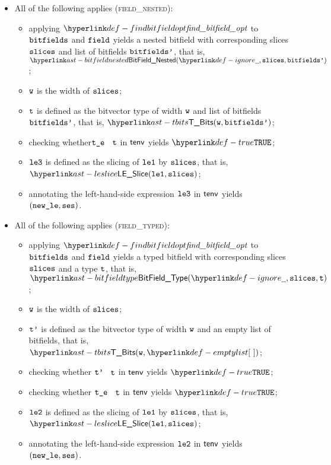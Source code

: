 \begin{itemize}
\begin{itemize}
    \item All of the following applies (\textsc{field\_nested}):
    \begin{itemize}
      \item applying $\findbitfieldopt$ to $\texttt{bitfields}$ and $\texttt{field}$ yields a nested bitfield with corresponding
            slices $\texttt{slices}$ and list of bitfields $\texttt{bitfields'}$, that is, \\ $\BitFieldNested(\Ignore, \slices, \bitfieldsp)$;
      \item $\texttt{w}$ is the width of $\texttt{slices}$;
      \item $\texttt{t}$ is defined as the bitvector type of width $\texttt{w}$ and list of bitfields $\texttt{bitfields'}$, that is, $\TBits(\vw, \bitfieldsp)$;
      \item checking whether$\texttt{t\_e}$ \typesatisfies\ $\texttt{t}$ in $\textsf{tenv}$ yields $\True$\ProseOrTypeError;
      \item $\texttt{le3}$ is defined as the slicing of $\texttt{le1}$ by $\texttt{slices}$, that is, \\ $\LESlice(\vleone, \slices)$;
      \item annotating the left-hand-side expression $\texttt{le3}$ in $\textsf{tenv}$ yields \\ $(\texttt{new\_le}, \texttt{ses})$\ProseOrTypeError.
    \end{itemize}

    \item All of the following applies (\textsc{field\_typed}):
    \begin{itemize}
      \item applying $\findbitfieldopt$ to $\texttt{bitfields}$ and $\texttt{field}$ yields a typed bitfield with corresponding
            slices $\texttt{slices}$ and a type $\texttt{t}$, that is, \\ $\BitFieldType(\Ignore, \vslices, \vt)$;
      \item $\texttt{w}$ is the width of $\texttt{slices}$;
      \item $\texttt{t'}$ is defined as the bitvector type of width $\texttt{w}$ and an empty list of bitfields, that is, $\TBits(\vw , \emptylist)$;
      \item checking whether $\texttt{t'}$ \typesatisfies\ $\texttt{t}$ in $\textsf{tenv}$ yields $\True$\ProseOrTypeError;
      \item checking whether $\texttt{t\_e}$ \typesatisfies\ $\texttt{t}$ in $\textsf{tenv}$ yields $\True$\ProseOrTypeError;
      \item $\texttt{le2}$ is defined as the slicing of $\texttt{le1}$ by $\texttt{slices}$, that is, \\ $\LESlice(\vleone, \slices)$;
      \item annotating the left-hand-side expression $\texttt{le2}$ in $\textsf{tenv}$ yields \\ $(\texttt{new\_le}, \texttt{ses})$\ProseOrTypeError.
    \end{itemize}
  \end{itemize}
\end{itemize}
